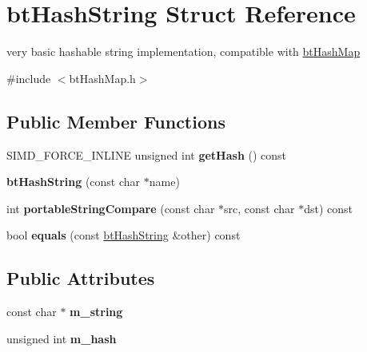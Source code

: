 \hypertarget{structbt_hash_string}{\section{bt\+Hash\+String Struct Reference}
\label{structbt_hash_string}
}


very basic hashable string implementation, compatible with \hyperlink{classbt_hash_map}{bt\+Hash\+Map}  




{\ttfamily \#include $<$bt\+Hash\+Map.\+h$>$}

\subsection*{Public Member Functions}
\begin{DoxyCompactItemize}
\item 
\hypertarget{structbt_hash_string_ab52b4e7576ccfc408386e3148dbd5734}{S\+I\+M\+D\+\_\+\+F\+O\+R\+C\+E\+\_\+\+I\+N\+L\+I\+N\+E unsigned int {\bfseries get\+Hash} () const }\label{structbt_hash_string_ab52b4e7576ccfc408386e3148dbd5734}

\item 
\hypertarget{structbt_hash_string_a66defd26b7b6b4c56d2f4abd35379eee}{{\bfseries bt\+Hash\+String} (const char $\ast$name)}\label{structbt_hash_string_a66defd26b7b6b4c56d2f4abd35379eee}

\item 
\hypertarget{structbt_hash_string_ae412e43830669da340ef1c871dd559ef}{int {\bfseries portable\+String\+Compare} (const char $\ast$src, const char $\ast$dst) const }\label{structbt_hash_string_ae412e43830669da340ef1c871dd559ef}

\item 
\hypertarget{structbt_hash_string_aea24d56093bbe5b85155f54c7d923f18}{bool {\bfseries equals} (const \hyperlink{structbt_hash_string}{bt\+Hash\+String} \&other) const }\label{structbt_hash_string_aea24d56093bbe5b85155f54c7d923f18}

\end{DoxyCompactItemize}
\subsection*{Public Attributes}
\begin{DoxyCompactItemize}
\item 
\hypertarget{structbt_hash_string_afe61df4c2a9cd01ffaeb1807ab7e7f3b}{const char $\ast$ {\bfseries m\+\_\+string}}\label{structbt_hash_string_afe61df4c2a9cd01ffaeb1807ab7e7f3b}

\item 
\hypertarget{structbt_hash_string_ae33a1798eaa8fdac9d75fd0cc226cc09}{unsigned int {\bfseries m\+\_\+hash}}\label{structbt_hash_string_ae33a1798eaa8fdac9d75fd0cc226cc09}

\end{DoxyCompactItemize}


